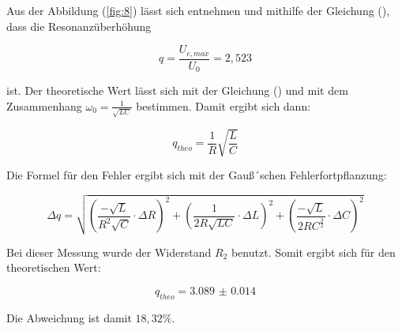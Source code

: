Aus der Abbildung (\ref{fig:8}) lässt sich entnehmen und mithilfe der Gleichung (),
dass die Resonanzüberhöhung

\begin{equation*}
  q = \frac{U_{c,max}}{U_0} = 2,523
\end{equation*}

ist. Der theoretische Wert lässt sich mit der Gleichung () und mit dem Zusammenhang
$\omega_0 = \frac{1}{\sqrt{LC}}$ bestimmen. Damit ergibt sich dann:

\begin{equation*}
  q_{theo} = \frac{1}{R} \sqrt{\frac{L}{C}}
\end{equation*}

Die Formel für den Fehler ergibt sich mit der Gauß´schen Fehlerfortpflanzung:

\begin{equation*}
  \Delta q = \sqrt{\left( \frac{-\sqrt{L}}{R^2\sqrt{C}} \cdot \Delta R \right)^2 +
  \left( \frac{1}{2R\sqrt{LC}} \cdot \Delta L \right)^2 +
  \left( \frac{-\sqrt{L}}{2RC^{\frac{3}{2}}} \cdot \Delta C \right)^2}
\end{equation*}

Bei dieser Messung wurde der Widerstand $R_2$ benutzt. Somit ergibt sich für den theoretischen
Wert:

\begin{equation*}
  q_{theo} = \num{3.089(14)}
\end{equation*}

Die Abweichung ist damit $18,32\% $.
